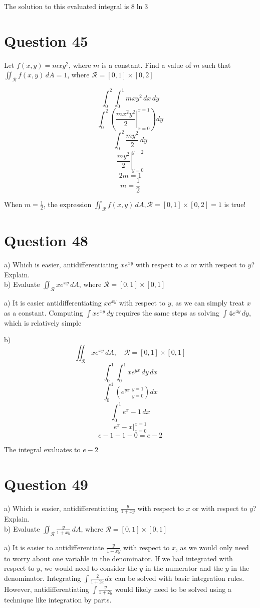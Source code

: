 \documentclass[hidelinks]{article}
\begin{document}
The solution to this evaluated integral is $8\ln 3$
\newpage
\section{Question 45}
Let $f(x, y) = mxy^2$, where $m$ is a constant. Find a value of $m$ such that $\iint_{\mathcal{R}} f(x, y) \, dA = 1$, where $\mathcal{R} = [0,1] \times [0,2]$

\[
	\int_0^2 \int_0^1 mxy^2 \,dx\,dy 
\]
\[
	\int_0^2 \left ( \left . \frac{mx^2y^2}{2} \right |_{x = 0}^{x = 1} \right )dy 
\]
\[
	\int_0^2 \frac{my^2}{2}\,dy 
\]
\[
	\left. \frac{my^2}{2} \right |_{y = 0}^{y = 2} 
\]
\[
	2m = 1
\]
\[
	m = \frac{1}{2}
\]

When $m = \frac{1}{2}$, the expression $\iint_{\mathcal{R}} f(x, y) \, dA, \mathcal{R} = [0,1] \times [0,2] = 1$ is true! 

\newpage
\section{Question 48}
a) Which is easier, antidifferentiating $xe^{xy}$ with respect to $x$ or with respect to $y$? Explain.\\
b) Evaluate $\iint_{\mathcal{R}} xe^{xy} \, dA$, where $\mathcal{R} = [0,1] \times [0,1]$

a) It is easier antidifferentiating $xe^{xy}$ with respect to $y$, as we can simply treat $x$ as a constant. Computing $\int xe^{xy} \, dy$ requires the same steps as solving $\int 4e^{4y}\,dy$, which is relatively simple

b)
\[
	\iint_{\mathcal{R}} xe^{xy} \, dA, \quad \mathcal{R} = [0,1] \times [0,1]
\]
\[
	\int_0^1 \int_0^1 xe^{yx} \,dy \, dx
\]
\[
	\int_0^1 \left(e^{yx} \Big |_{y = 0}^{y = 1}\right)dx
\]
\[
	\int_0^1 e^{x} - 1\,dx
\]
\[
	e^x - x \Big |_{x = 0}^{x = 1}
\]
\[
	e - 1 - 1 - 0 = e -2
\]

The integral evaluates to $e-2$


\newpage
\section{Question 49}
a) Which is easier, antidifferentiating $\frac{y}{1+xy}$ with respect to $x$ or with respect to $y$? Explain.\\
b) Evaluate $\iint_{\mathcal{R}} \frac{y}{1+xy} \, dA$, where $\mathcal{R} = [0,1] \times [0,1]$

a) It is easier to antidifferentiate $\frac{y}{1+xy}$ with respect to $x$, as we would only need to worry about one variable in the denominator. If we had integrated with respect to $y$, we would need to consider the $y$ in the numerator and the $y$ in the denominator. Integrating $\int \frac{2}{1+2x} dx$ can be solved with basic integration rules. However, antidifferentiating $\int \frac{y}{1+2y}$ would likely need to be solved using a technique like integration by parts. 
\end{document}
